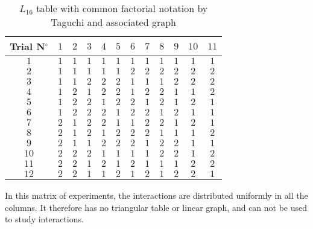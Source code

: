 \begin{itemize}
		\begin{table}[H]\centering
			\begin{center}
					\begin{tabular}{|c|c|c|c|c|c|c|c|c|c|c|c|}
						\hline
						\multicolumn{1}{c}{\cellcolor{black!30}\textbf{Trial N${}^\circ$}} & 
		  \multicolumn{1}{c}{\cellcolor{black!30}$1$} & 
		  \multicolumn{1}{c}{\cellcolor{black!30}$2$} & 
		  \multicolumn{1}{c}{\cellcolor{black!30}$3$} & 
		  \multicolumn{1}{c}{\cellcolor{black!30}$4$} & 
		  \multicolumn{1}{c}{\cellcolor{black!30}$5$} & 
		  \multicolumn{1}{c}{\cellcolor{black!30}$6$} & 
		  \multicolumn{1}{c}{\cellcolor{black!30}$7$}& 
		  \multicolumn{1}{c}{\cellcolor{black!30}$8$}& 
		  \multicolumn{1}{c}{\cellcolor{black!30}$9$}& 
		  \multicolumn{1}{c}{\cellcolor{black!30}$10$}& 
		  \multicolumn{1}{c}{\cellcolor{black!30}$11$}\\ \hline
					 $1$ & $1$ & $1$ & $1$ & $1$ & $1$ & $1$ & $1$ & $1$ & $1$ & $1$ & $1$\\ \hline
					 $2$ & $1$ & $1$ & $1$ & $1$ & $1$ & $2$ & $2$ & $2$ & $2$ & $2$ & $2$\\ \hline
					 $3$ & $1$ & $1$ & $2$ & $2$ & $2$ & $1$ & $1$ & $1$ & $2$ & $2$ & $2$\\ \hline
					 $4$ & $1$ & $2$ & $1$ & $2$ & $2$ & $1$ & $2$ & $2$ & $1$ & $1$ & $2$\\ \hline
					 $5$ & $1$ & $2$ & $2$ & $1$ & $2$ & $2$ & $1$ & $2$ & $1$  & $2$ & $1$\\ \hline
					 $6$ & $1$ & $2$ & $2$ & $2$ & $1$ & $2$ & $2$ & $1$ & $2$ & $1$ & $1$\\ \hline
					 $7$ & $2$ & $1$ & $2$ & $2$ & $1$ & $1$ & $2$ & $2$ & $1$ & $2$ & $1$\\ \hline
					 $8$ & $2$ & $1$ & $2$ & $1$ & $2$ & $2$ & $2$ & $1$ & $1$  & $1$ & $2$\\ \hline
					 $9$ & $2$ & $1$ & $1$ & $2$ & $2$ & $2$ & $1$ & $2$ & $2$ & $1$ & $1$\\ \hline
					$10$ & $2$ & $2$ & $2$ & $1$ & $1$ & $1$ & $1$ & $2$ & $2$  & $1$ & $2$\\ \hline
					$11$ & $2$ & $2$ & $1$ & $2$ & $1$ & $2$ & $1$ & $1$ & $1$ & $2$ & $2$\\ \hline
					$12$ & $2$ & $2$ & $1$ & $1$ & $2$ & $1$ & $2$ & $1$ & $2$ & $2$ & $1$\\ \hline
		 		\end{tabular}
			\end{center}
			\caption{$L_16$ table with common factorial notation by Taguchi and associated graph}
			\end{table}
			In this matrix of experiments, the interactions are distributed uniformly in all the columns. It therefore has no triangular table or linear graph, and can not be used to study interactions.
		

\end{itemize}
